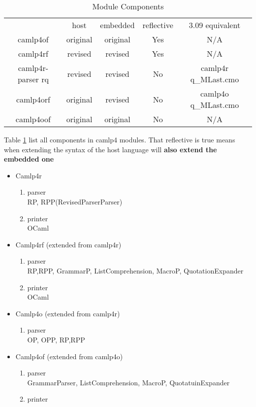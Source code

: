 \begin{table}
  \centering
  \begin{tabular}{|c|c|c|c|c|}
    \hline
                      & host     & embedded & reflective & 3.09 equivalent     \\
    camlp4of          & original & original & Yes        & N/A                 \\
    camlp4rf          & revised  & revised  & Yes        & N/A                 \\
    camlp4r-parser rq & revised  & revised  & No         & camlp4r q\_MLast.cmo \\
    camlp4orf         & original & revised  & No         & camlp4o q\_MLast.cmo \\
    camlp4oof         & original & original & No         & N/A                 \\
    \hline
  \end{tabular}
  \caption{Module Components}
  \label{tab:camlp4_module_components}
\end{table}

Table \ref{tab:camlp4_module_components} list all components in camlp4
modules. That reflective is true means when extending the syntax of the
host language will \textbf{ also extend the embedded one}

\begin{itemize}  
\item Camlp4r
    \begin{enumerate}
    \item parser \\
      RP, RPP(RevisedParserParser)
    \item printer \\
      OCaml
    \end{enumerate}
\item Camlp4rf (extended from camlp4r)
    \begin{enumerate}
    \item parser \\
      RP,RPP, GrammarP, ListComprehension, MacroP, QuotationExpander
    \item printer \\
      OCaml
    \end{enumerate}
\item Camlp4o (extended from camlp4r)
    \begin{enumerate}
    \item parser \\
      OP, OPP, RP,RPP
    \end{enumerate}
\item Camlp4of (extended from camlp4o)
    \begin{enumerate}
    \item parser \\
      GrammarParser, ListComprehension, MacroP, QuotatuinExpander
    \item printer 
    \end{enumerate}
\end{itemize}


